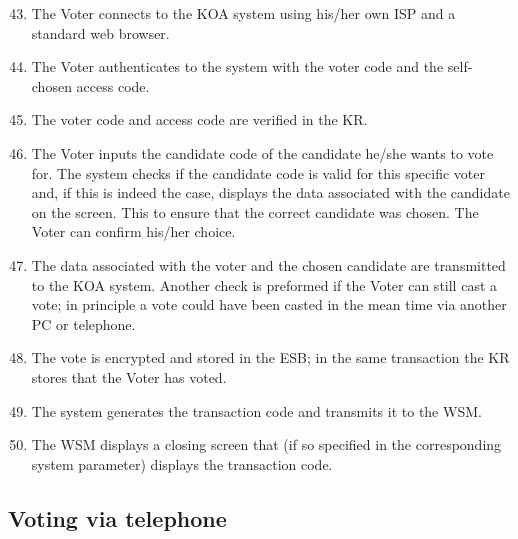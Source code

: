 \begin{enumerate}
\setcounter{enumi}{42}
	\item The Voter connects to the KOA system using his/her own
	ISP and a standard web browser.

	\item The Voter authenticates to the system with the voter
	code and the self-chosen access code.

	\item The voter code and access code are verified in the KR.

	\item The Voter inputs the candidate code of the candidate
	he/she wants to vote for. The system checks if the candidate
	code is valid for this specific voter and, if this is indeed
	the case, displays the data associated with the candidate on
	the screen. This to ensure that the correct candidate was
	chosen. The Voter can confirm his/her choice.

	\item The data associated with the voter and the chosen
	candidate are transmitted to the KOA system. Another check is
	preformed if the Voter can still cast a vote; in principle a
	vote could have been casted in the mean time via another PC or
	telephone.

	\item The vote is encrypted and stored in the ESB; in the same
	transaction the KR stores that the Voter has voted.

	\item The system generates the transaction code and transmits
	it to the WSM.

	\item The WSM displays a closing screen that (if so specified
	in the corresponding system parameter) displays the
	transaction code.

\end{enumerate}

\subsection{Voting via telephone}\label{sec3:voting-via-telephone}


